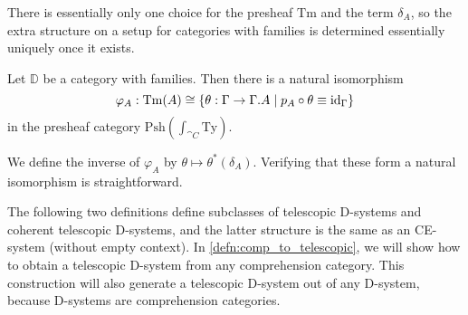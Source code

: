 There is essentially only one choice for the presheaf $\mathrm{Tm}$ and the
term $\delta_A$, so the extra structure on a setup for categories with families
is determined essentially uniquely once it exists.

\begin{defn}\label{lem:cwf_to_dsys}
Let $\mathbb{D}$ be a category with families. Then there is a natural isomorphism
\begin{equation*}
\varphi_A:\mathrm{Tm}(A)\cong\{\theta:\Gamma\to\ctxext{\Gamma}{A}\mid p_A\circ\theta\jdeq\catid{\Gamma}\}
\end{equation*}
in the presheaf category $\mathrm{Psh}(\int_{\cat{C}}\mathrm{Ty})$. 
\begin{comment}
The
natural isomorphism $\varphi$ is such that the term $\delta_A\in\mathrm{Tm}((p_A)^\ast(A))$
corresponds to the unique arrow $\tilde{q}_A$ which fits in the diagram
\begin{equation*}
\begin{tikzcd}
\ctxext{\Gamma}{A} \arrow[ddr,bend right=15,equals] \arrow[drr,bend left=15,equals] \arrow[dr,"{\tilde \delta_A}"] \\
& \ctxext{{\Gamma}{A}}{(p_A)^\ast(A)} \arrow[d,fib] & \ctxext{\Gamma}{A} \arrow[d,fib] \\
& \ctxext{\Gamma}{A} \arrow[r,"{p_A}"] & \Gamma
\end{tikzcd}
\end{equation*}
\end{comment}
\end{defn}

\begin{constr}
We define the inverse of $\varphi_A$ by $\theta\mapsto\theta^\ast(\delta_A)$. Verifying
that these form a natural isomorphism is straightforward.
\end{constr}

The following two definitions define subclasses of telescopic D-systems and 
coherent telescopic D-systems, and the latter structure is the same as an CE-system
(without empty context). In \autoref{defn:comp_to_telescopic}, we will show how
to obtain a telescopic D-system from any comprehension category. This construction
will also generate a telescopic D-system out of any D-system, because D-systems
are comprehension categories.


